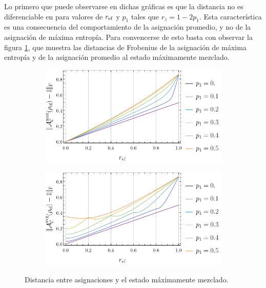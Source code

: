 Lo primero que puede observarse en dichas gráficas es que la distancia no es diferenciable en para valores de $r_{\text{ef}}$ y $p_{1}$ tales que $r_{z}=1-2p_{1}$. Esta característica es una consecuencia del comportamiento de la asignación promedio, y no de la asignación de máxima entropía. Para convencerse de esto basta con observar la figura \ref{ap:DistAvgMaxEntId}, que muestra las distancias de Frobenius de la asignación de máxima entropía y de la asignación promedio al estado máximamente mezclado.
\begin{figure}[ht!]
    \centering
    \begin{subfigure}{0.5\textwidth}
      \centering
      \includegraphics[width=1.\linewidth]{appendices/figures/dist_maxent_or_vs_p.png}
    \end{subfigure}%
    \begin{subfigure}{0.5\textwidth}
      \centering
      \includegraphics[width=1.\linewidth]{appendices/figures/dist_avg_or_vs_p.png}
    \end{subfigure}
    \caption{Distancia entre asignaciones y el estado máximamente mezclado.}\label{ap:DistAvgMaxEntId}
\end{figure}

